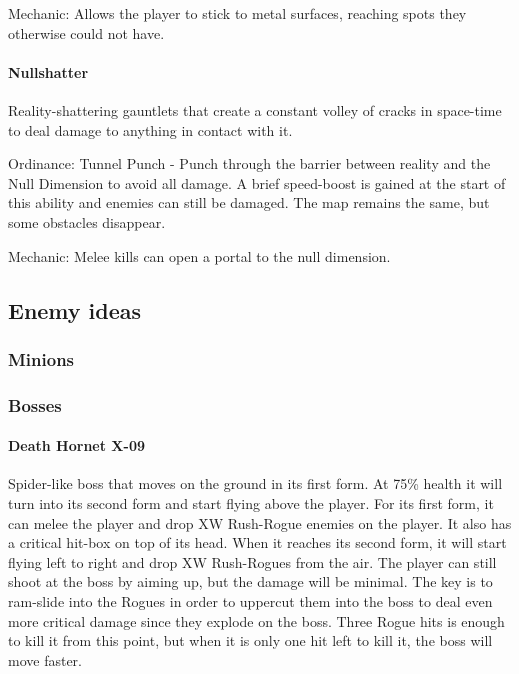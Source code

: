 \documentclass[../Main.tex]{subfiles}
\begin{document}
Mechanic: Allows the player to stick to metal surfaces, reaching spots they otherwise could not have. 

\paragraph{Nullshatter}

Reality-shattering gauntlets that create a constant volley of cracks in space-time to deal damage to anything in contact with it.

Ordinance: Tunnel Punch - Punch through the barrier between reality and the Null Dimension to avoid all damage. A brief speed-boost is gained at the start of this ability and enemies can still be damaged. The map remains the same, but some obstacles disappear.

Mechanic: Melee kills can open a portal to the null dimension. 

\subsection{Enemy ideas}

\subsubsection{Minions}

\subsubsection{Bosses}

\paragraph{Death Hornet X-09}

Spider-like boss that moves on the ground in its first form. At 75\% health it will turn into its second form and start flying above the player. For its first form, it can melee the player and drop XW Rush-Rogue enemies on the player. It also has a critical hit-box on top of its head. When it reaches its second form, it will start flying left to right and drop XW Rush-Rogues from the air. The player can still shoot at the boss by aiming up, but the damage will be minimal. The key is to ram-slide into the Rogues in order to uppercut them into the boss to deal even more critical damage since they explode on the boss. Three Rogue hits is enough to kill it from this point, but when it is only one hit left to kill it, the boss will move faster. 
\end{document}
